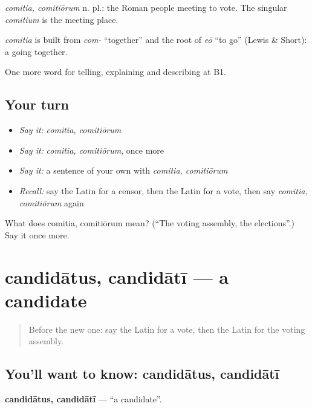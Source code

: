 \emph{comitia, comitiōrum} n. pl.: the Roman people meeting to vote. The singular \emph{comitium} is the meeting place.

\begin{cousinweb}
\emph{comitia} is built from \emph{com-} \textquotedblleft{}together\textquotedblright{} and the root of \emph{eō} \textquotedblleft{}to go\textquotedblright{} (Lewis \& Short): a going together.
\end{cousinweb}

\begin{grammarlens}[title={What you've built}]
One more word for telling, explaining and describing at B1.
\end{grammarlens}

\subsection*{Your turn}
\begin{itemize}
\raggedright
  \item \emph{Say it:} \emph{comitia, comitiōrum}
  \item \emph{Say it:} \emph{comitia, comitiōrum}, once more
  \item \emph{Say it:} a sentence of your own with \emph{comitia, comitiōrum}
  \item \emph{Recall:} say the Latin for a censor, then the Latin for a vote, then say \emph{comitia, comitiōrum} again
\end{itemize}

\begin{tcolorbox}[breakable,colback=teal!4,colframe=teal!35!black,title={Before you move on}]
What does comitia, comitiōrum mean? (\textquotedblleft{}The voting assembly, the elections\textquotedblright{}.) Say it once more.
\end{tcolorbox}
\section[candidātus, candidātī]{candidātus, candidātī — a candidate}

\label{lesson:LA-C384-candidatus}



\begin{quote}
Before the new one: say the Latin for a vote, then the Latin for the voting assembly.
\end{quote}

\subsection*{You'll want to know: candidātus, candidātī}
\textbf{candidātus, candidātī} — \textquotedblleft{}a candidate\textquotedblright{}.

